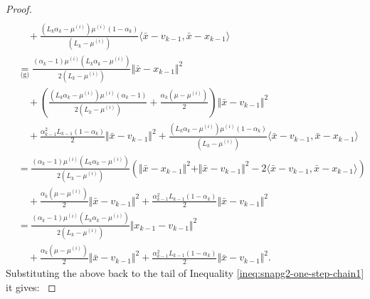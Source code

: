 \documentclass[12pt]{article}
\begin{document}
\begin{proof}
{\begin{align*}
                    \\&\quad 
                    + \frac{(L_k\alpha_k  - \mu^{(i)})\mu^{(i)}(1 - \alpha_k)}{(L_k - \mu^{(i)})}\langle \bar x - v_{k - 1}, \bar x - x_{k - 1}\rangle
                \\
                & \underset{\text{(g)}}{=} 
                \frac{(\alpha_k - 1)\mu^{(i)}\left(L_k\alpha_k - \mu^{(i)}\right)}
                {2\left(L_k - \mu^{(i)}\right)}\Vert \bar x - x_{k - 1}\Vert^2
                    \\ &\quad 
                    + \left(
                        \frac{
                            \left(L_k \alpha_k - \mu^{(i)}\right)\mu^{(i)}
                            \left(\alpha_k - 1\right)
                        }
                        {2(L_k - \mu^{(i)})}
                        + \frac{\alpha_k(\mu - \mu^{(i)})}{2}
                    \right) \Vert \bar x - v_{k - 1}\Vert^2
                    \\ &\quad 
                    + \frac{\alpha_{k - 1}^2L_{k - 1}(1 - \alpha_k)}{2} \Vert \bar x - v_{k - 1}\Vert^2
                    + \frac{(L_k\alpha_k  - \mu^{(i)})\mu^{(i)}(1 - \alpha_k)}{(L_k - \mu^{(i)})}\langle \bar x - v_{k - 1}, \bar x - x_{k - 1}\rangle
                \\
                &= 
                \frac{(\alpha_k - 1)\mu^{(i)}\left(L_k\alpha_k - \mu^{(i)}\right)}{2\left(L_k - \mu^{(i)}\right)}\left(
                    \Vert \bar x - x_{k - 1}\Vert^2 + \Vert \bar x - v_{k - 1}\Vert^2 - 2\langle \bar x - v_{k - 1}, \bar x - x_{k - 1}\rangle
                \right) 
                    \\ &\quad 
                    + \frac{\alpha_k(\mu - \mu^{(i)})}{2} \Vert \bar x - v_{k - 1}\Vert^2
                    + \frac{\alpha_{k - 1}^2L_{k - 1}(1 - \alpha_k)}{2} \Vert \bar x - v_{k - 1}\Vert^2
                \\
                &= \frac{(\alpha_k - 1)\mu^{(i)}\left(L_k\alpha_k - \mu^{(i)}\right)}{2\left(L_k - \mu^{(i)}\right)}
                    \Vert x_{k - 1} - v_{k - 1} \Vert^2
                    \\ &\quad 
                    + \frac{\alpha_k(\mu - \mu^{(i)})}{2} \Vert \bar x - v_{k - 1}\Vert^2
                    + \frac{\alpha_{k - 1}^2L_{k - 1}(1 - \alpha_k)}{2} \Vert \bar x - v_{k - 1}\Vert^2.
            \end{align*}
            }
            Substituting the above back to the tail of Inequality \eqref{ineq:snapg2-one-step-chain1} it gives: 
            {\allowdisplaybreaks
}
\end{proof}
\end{document}
